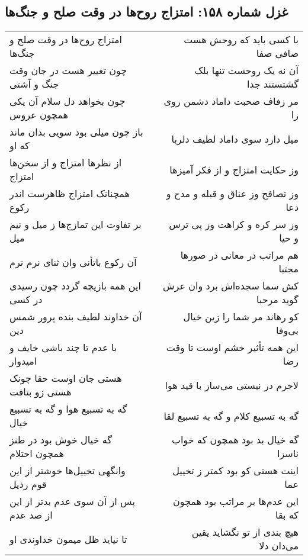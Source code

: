 \begin{center}
\section*{غزل شماره ۱۵۸: امتزاج روح‌ها در وقت صلح و جنگ‌ها}
\label{sec:0158}
\begin{longtable}{l p{0.5cm} r}
امتزاج روح‌ها در وقت صلح و جنگ‌ها
&&
با کسی باید که روحش هست صافی صفا
\\
چون تغییر هست در جان وقت جنگ و آشتی
&&
آن نه یک روحست تنها بلک گشتستند جدا
\\
چون بخواهد دل سلام آن یکی همچون عروس
&&
مر زفاف صحبت داماد دشمن روی را
\\
باز چون میلی بود سویی بدان ماند که او
&&
میل دارد سوی داماد لطیف دلربا
\\
از نظرها امتزاج و از سخن‌ها امتزاج
&&
وز حکایت امتزاج و از فکر آمیزها
\\
همچنانک امتزاج ظاهرست اندر رکوع
&&
وز تصافح وز عناق و قبله و مدح و دعا
\\
بر تفاوت این تمازج‌ها ز میل و نیم میل
&&
وز سر کره و کراهت وز پی ترس و حیا
\\
آن رکوع باتأنی وان ثنای نرم نرم
&&
هم مراتب در معانی در صورها مجتبا
\\
این همه بازیچه گردد چون رسیدی در کسی
&&
کش سما سجده‌اش برد وان عرش گوید مرحبا
\\
آن خداوند لطیف بنده پرور شمس دین
&&
کو رهاند مر شما را زین خیال بی‌وفا
\\
با عدم تا چند باشی خایف و امیدوار
&&
این همه تأثیر خشم اوست تا وقت رضا
\\
هستی جان اوست حقا چونک هستی زو بتافت
&&
لاجرم در نیستی می‌ساز با قید هوا
\\
گه به تسبیع هوا و گه به تسبیع خیال
&&
گه به تسبیع کلام و گه به تسبیع لقا
\\
گه خیال خوش بود در طنز همچون احتلام
&&
گه خیال بد بود همچون که خواب ناسزا
\\
وانگهی تخییل‌ها خوشتر از این قوم رذیل
&&
اینت هستی کو بود کمتر ز تخییل عما
\\
پس از آن سوی عدم بدتر از این از صد عدم
&&
این عدم‌ها بر مراتب بود همچون که بقا
\\
تا نیاید ظل میمون خداوندی او
&&
هیچ بندی از تو نگشاید یقین می‌دان دلا
\\
\end{longtable}
\end{center}
